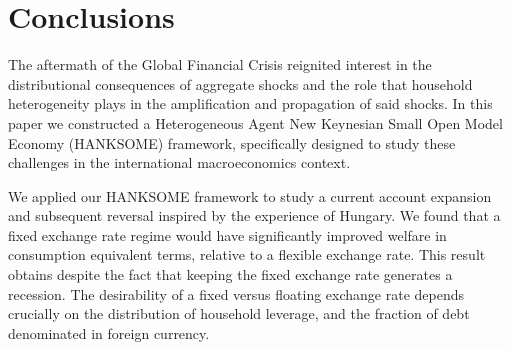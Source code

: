 \documentclass[\latexroot/\projectname]{subfiles}
\begin{document}
\section{Conclusions}\whenintegrated{\label{conclusion}}
\whenintegrated{\label{sec:conclusion}} %

The aftermath of the Global Financial Crisis reignited interest in the distributional consequences of aggregate shocks and the role that household heterogeneity plays in the amplification and propagation of said shocks. In this paper we constructed a Heterogeneous Agent New Keynesian Small Open Model Economy (HANKSOME) framework, specifically designed to study these challenges in the international macroeconomics context.

We applied our HANKSOME framework to study a current account expansion and subsequent reversal inspired by the experience of Hungary. We found that a fixed exchange rate regime would have significantly improved welfare in consumption equivalent terms, relative to a flexible exchange rate. This result obtains despite the fact that keeping the fixed exchange rate generates a recession. The desirability of a fixed versus floating exchange rate depends crucially on the distribution of household leverage, and the fraction of debt denominated in foreign currency.

\smartbib
\end{document}
